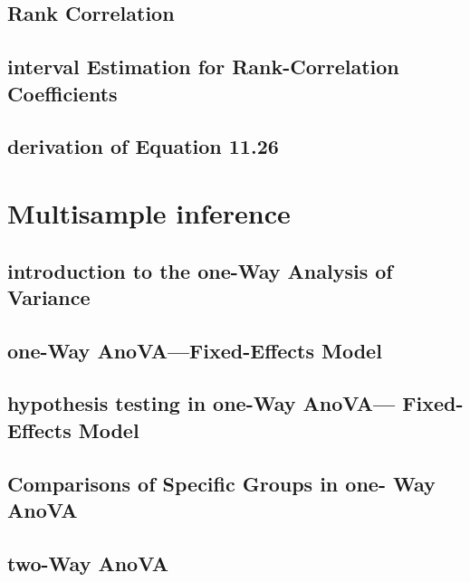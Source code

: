\documentclass[12pt,]{article}
\theoremstyle{definition}
\theoremstyle{definition}
\theoremstyle{definition}
\theoremstyle{remark}
\begin{document}
\subsection{Rank Correlation}\label{rank-correlation}

\subsection{interval Estimation for Rank-Correlation
Coefficients}\label{interval-estimation-for-rank-correlation-coefficients}

\subsection{derivation of Equation
11.26}\label{derivation-of-equation-11.26}

\section{Multisample inference}\label{multisample-inference}

\subsection{introduction to the one-Way Analysis of
Variance}\label{introduction-to-the-one-way-analysis-of-variance}

\subsection{one-Way AnoVA---Fixed-Effects
Model}\label{one-way-anovafixed-effects-model}

\subsection{hypothesis testing in one-Way AnoVA--- Fixed-Effects
Model}\label{hypothesis-testing-in-one-way-anova-fixed-effects-model}

\subsection{Comparisons of Specific Groups in one- Way
AnoVA}\label{comparisons-of-specific-groups-in-one--way-anova}

\subsection{two-Way AnoVA}\label{two-way-anova}
\end{document}
